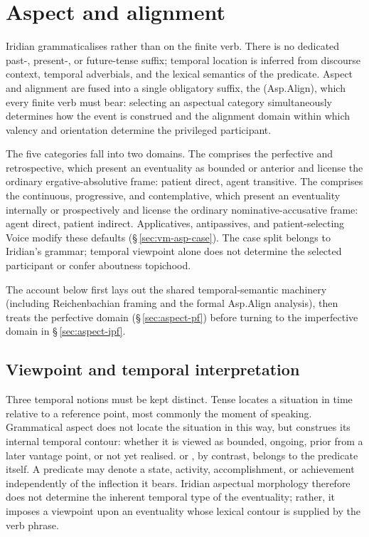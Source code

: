 \section{Aspect and alignment}
\label{sec:aspect}

Iridian grammaticalises  rather than  on the finite
verb. There is no dedicated past-, present-, or future-tense suffix; temporal
location is inferred from discourse context, temporal adverbials, and the
lexical semantics of the predicate. Aspect and alignment are fused into a single
obligatory suffix, the  (Asp.Align), which every
finite verb must bear: selecting an aspectual category simultaneously determines
how the event is construed and the alignment domain within which
valency and orientation determine the privileged participant.

The five  categories fall into two domains. The
 comprises the perfective and retrospective, which
present an eventuality as bounded or anterior and license the ordinary
ergative-absolutive frame: patient direct, agent transitive. The
 comprises the continuous, progressive, and
contemplative, which present an eventuality internally or prospectively and
license the ordinary nominative-accusative frame: agent direct, patient
indirect. Applicatives, antipassives, and patient-selecting Voice modify these
defaults (§\,\ref{sec:vm-asp-case}). The case split belongs to Iridian's
grammar; temporal viewpoint alone does not determine the selected participant
or confer aboutness topichood.

The account below first lays out the shared temporal-semantic machinery
(including Reichenbachian framing and the formal Asp.Align analysis), then treats
the perfective domain (§\,\ref{sec:aspect-pf}) before turning to the imperfective domain
in §\,\ref{sec:aspect-ipf}.

\subsection{Viewpoint and temporal interpretation}

Three temporal notions must be kept distinct. Tense locates a situation in time
relative to a reference point, most commonly the moment of speaking. Grammatical
aspect does not locate the situation in this way, but construes its internal
temporal contour: whether it is viewed as bounded, ongoing, prior from a later
vantage point, or not yet realised.  or ,
by contrast, belongs to the predicate itself. A predicate may denote a state,
activity, accomplishment, or achievement independently of the inflection it
bears. Iridian aspectual morphology therefore does not determine the inherent
temporal type of the eventuality; rather, it imposes a viewpoint upon an
eventuality whose lexical contour is supplied by the verb phrase.

